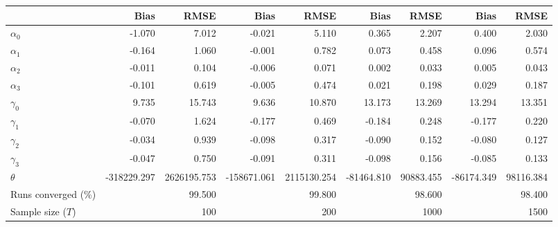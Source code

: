 
\begin{tabular}[t]{lrrrrrrrr}
\toprule
  & Bias & RMSE & Bias & RMSE & Bias & RMSE & Bias & RMSE\\
\midrule
$\alpha_{0}$ & -1.070 & 7.012 & -0.021 & 5.110 & 0.365 & 2.207 & 0.400 & 2.030\\
$\alpha_{1}$ & -0.164 & 1.060 & -0.001 & 0.782 & 0.073 & 0.458 & 0.096 & 0.574\\
$\alpha_{2}$ & -0.011 & 0.104 & -0.006 & 0.071 & 0.002 & 0.033 & 0.005 & 0.043\\
$\alpha_{3}$ & -0.101 & 0.619 & -0.005 & 0.474 & 0.021 & 0.198 & 0.029 & 0.187\\
$\gamma_{0}$ & 9.735 & 15.743 & 9.636 & 10.870 & 13.173 & 13.269 & 13.294 & 13.351\\
$\gamma_{1}$ & -0.070 & 1.624 & -0.177 & 0.469 & -0.184 & 0.248 & -0.177 & 0.220\\
$\gamma_{2}$ & -0.034 & 0.939 & -0.098 & 0.317 & -0.090 & 0.152 & -0.080 & 0.127\\
$\gamma_{3}$ & -0.047 & 0.750 & -0.091 & 0.311 & -0.098 & 0.156 & -0.085 & 0.133\\
$\theta$ & -318229.297 & 2626195.753 & -158671.061 & 2115130.254 & -81464.810 & 90883.455 & -86174.349 & 98116.384\\
Runs converged (\%) &  & 99.500 &  & 99.800 &  & 98.600 &  & 98.400\\
Sample size ($T$) &  & 100 &  & 200 &  & 1000 &  & 1500\\
\bottomrule
\end{tabular}
